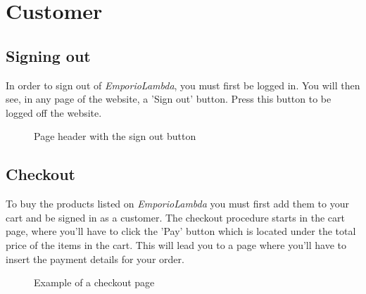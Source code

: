 \section{Customer}

\subsection{Signing out}
In order to sign out of \textit{EmporioLambda}, you must first be logged in. You will then see, in any page of the website, a 'Sign out' button. Press this button to be logged off the website.

\begin{figure}[H]
%
\caption{Page header with the sign out button}
\end{figure}

\subsection{Checkout}
To buy the products listed on \textit{EmporioLambda} you must first add them to your cart and be signed in as a customer. The checkout procedure starts in the cart page, where you'll have to click the 'Pay' button which is located under the total price of the items in the cart. This will lead you to a page where you'll have to insert the payment details for your order.

\begin{figure}[H]
%
\caption{Example of a checkout page}
\end{figure}

